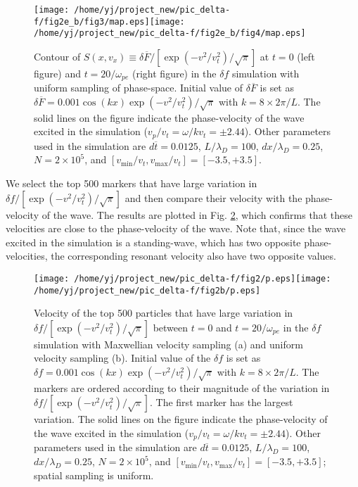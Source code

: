 \documentclass{article}
\begin{document}
\begin{figure}[h]
  \texttt{[image: /home/yj/project\_new/pic\_delta-f/fig2e\_b/fig3/map.eps]}\texttt{[image: /home/yj/project\_new/pic\_delta-f/fig2e\_b/fig4/map.eps]}
  \caption{\label{16-4-17-e1}Contour of $S (x, v_x) \equiv \delta \overline{F}
  / \left[ \exp (- v^2 / v_t^2) / \sqrt{\pi} \right]$ at $t = 0$ (left figure)
  and $t = 20 / \omega_{p e}$ (right figure) in the $\delta f$ simulation with
  uniform sampling of phase-space. Initial value of $\delta \overline{F}$ is
  set as $\delta \overline{F} = 0.001 \cos (k x) \exp (- v^2 / v_t^2) /
  \sqrt{\pi}$ with $k = 8 \times 2 \pi / L$. The solid lines on the figure
  indicate the phase-velocity of the wave excited in the simulation ($v_p /
  v_t = \omega / k v_t = \pm 2.44$). Other parameters used in the simulation
  are $d \overline{t} = 0.0125$, $L / \lambda_D = 100$, $d x / \lambda_D =
  0.25$, $N = 2 \times 10^5$, and $[v_{\min} / v_t, v_{\max} / v_t] = [- 3.5,
  + 3.5]$.}
\end{figure}

We select the top 500 markers that have large variation in $\delta f / \left[
\exp (- v^2 / v_t^2) / \sqrt{\pi} \right]$ and then compare their velocity
with the phase-velocity of the wave. The results are plotted in Fig.
\ref{16-4-11-p3}, which confirms that these velocities are close to the
phase-velocity of the wave. Note that, since the wave excited in the
simulation is a standing-wave, which has two opposite phase-velocities, the
corresponding resonant velocity also have two opposite values.

\begin{figure}[h]
  \texttt{[image: /home/yj/project\_new/pic\_delta-f/fig2/p.eps]}\texttt{[image: /home/yj/project\_new/pic\_delta-f/fig2b/p.eps]}
  \caption{\label{16-4-11-p3}Velocity of the top 500 particles that have large
  variation in $\delta f / \left[ \exp (- v^2 / v_t^2) / \sqrt{\pi} \right]$
  between $t = 0$ and $t = 20 / \omega_{p e}$ in the $\delta f$ simulation
  with Maxwellian velocity sampling (a) and uniform velocity sampling (b).
  Initial value of the $\delta f$ is set as $\delta f = 0.001 \cos (k x) \exp
  (- v^2 / v_t^2) / \sqrt{\pi}$ with $k = 8 \times 2 \pi / L$. The markers are
  ordered according to their magnitude of the variation in $\delta f / \left[
  \exp (- v^2 / v_t^2) / \sqrt{\pi} \right]$. The first marker has the largest
  variation. The solid lines on the figure indicate the phase-velocity of the
  wave excited in the simulation ($v_p / v_t = \omega / k v_t = \pm 2.44$).
  Other parameters used in the simulation are $d \overline{t} = 0.0125$, $L /
  \lambda_D = 100$, $d x / \lambda_D = 0.25$, $N = 2 \times 10^5$, and
  $[v_{\min} / v_t, v_{\max} / v_t] = [- 3.5, + 3.5]$; spatial sampling is
  uniform.}
\end{figure}
\end{document}
